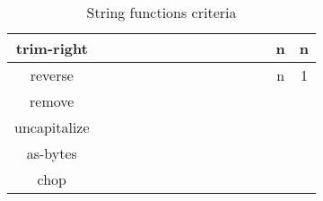 \documentclass[anonymous,sigplan,review,11pt,nonacm,natbib=false]{acmart}
\begin{document}
\begin{table*}[]
\begin{tabular}{|c||c|c|c|c|c|c|c|c|c|c|c|c|c|c|}
            trim-right &  &  &  &  &  &  &  &  &  &  &  &  & n & n \\ \hline

            reverse &  &  &  &  &  &  &  &  &  &  &  &  & n & 1 \\ \hline

            remove &  &  &  &  &  &  &  &  &  &  &  &  &  & \\ \hline

            uncapitalize &  &  &  &  &  &  &  &  &  &  &  &  &  & \\ \hline

            as-bytes &  &  &  &  &  &  &  &  &  &  &  &  &  & \\ \hline

            chop &  &  &  &  &  &  &  &  &  &  &  &  &  & \\ \hline


        \end{tabular}
        \caption{String functions criteria}
        \label{tab:my_label}
    \end{table*}

    \printbibliography
\end{document}
